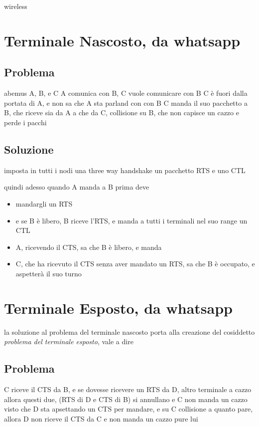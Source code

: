 \documentclass[11pt]{article}
\author{Biggie Dickus}
\date{\today}
\title{}
\begin{document}
\tableofcontents

wireless

\section{Terminale Nascosto, da whatsapp}
\label{sec:orgb520203}
\subsection{Problema}
\label{sec:org7d8ac78}
abemus A, B, e C
A comunica con B, C vuole comunicare con B
C è fuori dalla portata di A, e non sa che A sta parland con con B
C manda il suo pacchetto a B, che riceve sia da A a che da C, collisione su B, che non capisce un cazzo e perde i pacchi

\subsection{Soluzione}
\label{sec:orgc441f11}
imposta in tutti i nodi una three way handshake un pacchetto RTS e uno CTL

quindi adesso quando A manda a B prima deve
\begin{itemize}
\item mandargli un RTS
\item e se B è libero, B riceve l'RTS, e manda a tutti i terminali nel suo range un CTL
\item A, ricevendo il CTS, sa che B è libero, e manda
\item C, che ha ricevuto il CTS senza aver mandato un RTS, sa che B è occupato, e aspetterà il suo turno
\end{itemize}


\section{Terminale Esposto, da whatsapp}
\label{sec:org7ae395b}
la soluzione al problema del terminale nascosto porta alla creazione del cosiddetto \emph{problema del terminale esposto}, vale a dire

\subsection{Problema}
\label{sec:org3dacb98}
C riceve il CTS da B, e se dovesse ricevere un RTS da D, altro terminale a cazzo allora questi due, (RTS di D e CTS di B) si annullano e C non manda un cazzo
visto che D sta apsettando un CTS per mandare, e su C collisione a quanto pare, allora D non riceve il CTS da C e non manda un cazzo pure lui
\end{document}
